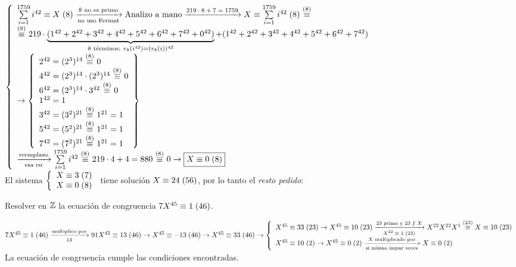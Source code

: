 \begin{enumerate}[label=\roman*)]
	      $\llave{l}
		      {
			      \congruencia{\sumLocal i^{42}}{X}{8}
			      \flecha{8 no es primo}[no uso Fermat]
			      \text{Analizo a mano}
			      \flecha{$219 \cdot 8 + 7 = 1759$}
			      \congruencia{X}{\sumLocal i^{42}}{8} \conga8
			      \\
			      \conga8 219 \cdot \ub{(1^{42} + 2^{42} + 3^{42} + 4^{42} + 5^{42} + 6^{42} + 7^{42} + 0^{42})}{\text{8 términos: } r_8(i^{42}) = (r_8(i))^{42} }
			      + (1^{42} + 2^{42} + 3^{42} + 4^{42} + 5^{42} + 6^{42} + 7^{42}) \\
			      \to
			      \llaves{l}{
				      2^{42} = (2^3)^{14}\conga8 0\\
				      4^{42} = (2^3)^{14} \cdot (2^3)^{14}\conga8 0\\
				      6^{42} = (2^3)^{14} \cdot 3^{42} \conga8 0\\
				      1^{42} = 1\\
				      3^{42} = (3^2)^{21} \conga8 1^{21} = 1\\
				      5^{42} = (5^2)^{21} \conga8 1^{21} = 1\\
				      7^{42} = (7^2)^{21} \conga8 1^{21} = 1
			      }\\
			      \flecha{reemplazo}[esa en]
			      \sumLocal i^{42} \conga8 219 \cdot 4 + 4  = 880 \conga8 0 \to \boxed{\congruencia{X}{0}{8}}\\
		      }$\\
	      El sistema
	      $\llave{l}{
			      \congruencia{X}{3}{7} \\
			      \congruencia{X}{0}{8} \\
		      }$ tiene solución $\congruencia{X}{24}{56}$, por lo tanto el \textit{resto pedido}: 
\end{enumerate}




\setcounter{ejercicio}{21}
\ejercicio
Resolver en $\enteros$ la ecuación de congruencia $\congruencia{7X^{45}}{1}{46}$.

\separadorCorto
$\congruencia{7X^{45}}{1}{46}
	\flecha{multiplico por}[13]
	\congruencia{91X^{45}}{13}{46}
	\to \congruencia{X^{45}}{-13}{46}
	\to \congruencia{X^{45}}{33}{46}\\
	\to
	\llave{l}{
		\congruencia{X^{45}}{33}{23} \to\congruencia{X^{45}}{10}{23}
		\flecha{23 primo y $23\noDivide X$}[$\congruencia{X^{22}}{1}{23}$]
		X^{22} X^{22} X^{1} \conga{23} \congruencia{X}{10}{23}\\

		\congruencia{X^{45}}{10}{2} \to  \congruencia{X^{45}}{0}{2}
		\flecha{$X$ multiplicado por}[si mismo impar veces]
		\congruencia{X}{0}{2}\\
	}
$\\
La ecuación de congruencia  cumple las condiciones encontradas.



